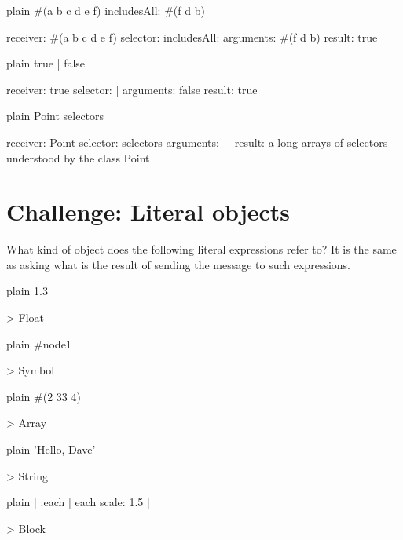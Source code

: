\documentclass[10pt,twoside,english]{_support/latex/sbabook/sbabook}
\begin{document}
\begin{displaycode}{plain}
#(a b c d e f) includesAll: #(f d b)

	receiver: #(a b c d e f)
	selector: includesAll:
	arguments: #(f d b)
	result: true
\end{displaycode}

\begin{displaycode}{plain}
true | false

	receiver: true
	selector: |
	arguments: false
	result: true
\end{displaycode}

\begin{displaycode}{plain}
Point selectors

	receiver: Point 
	selector: selectors
	arguments: _
	result: a long arrays of selectors understood by the class Point 
\end{displaycode}
\section{Challenge: Literal objects}
What kind of object does the following literal expressions refer to? It is the same as asking what is the result of sending the  message to such expressions. 

\begin{displaycode}{plain}
1.3

> Float
\end{displaycode}

\begin{displaycode}{plain}
#node1

> Symbol
\end{displaycode}

\begin{displaycode}{plain}
#(2 33 4)

> Array
\end{displaycode}

\begin{displaycode}{plain}
'Hello, Dave'

> String
\end{displaycode}

\begin{displaycode}{plain}
[ :each | each scale: 1.5 ]

> Block
\end{displaycode}

\end{document}
